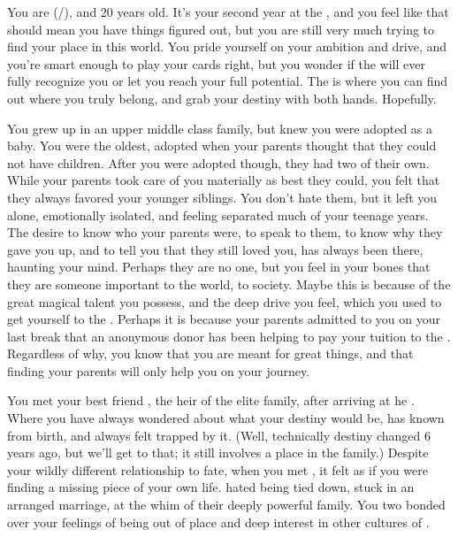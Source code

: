 \documentclass[char]{GL2020}
\begin{document}
\name{\cAmbition{}}

You are \cAmbition{\full} (\cAmbition{\they}/\cAmbition{\them}), and 20 years old. It's your second year at the \pSchool{}, and you feel like that should mean you have things figured out, but you are still very much trying to find your place in this world. You pride yourself on your ambition and drive, and you're smart enough to play your cards right, but you wonder if the \pTechies{} will ever fully recognize you or let you reach your full potential. The \pSchool{} is where you can find out where you truly belong, and grab your destiny with both hands. Hopefully.  

You grew up in an upper middle class family,  but knew you were adopted as a baby.  You were the oldest, adopted when your parents thought that they could not have children.  After you were adopted though, they had two of their own.  While your parents took care of you materially as best they could, you felt that they always favored your younger siblings.  You don’t hate them, but it left you alone, emotionally isolated, and feeling separated much of your teenage years.  The desire to know who your parents were, to speak to them, to know why they gave you up,  and to tell you that they still loved you, has always been there, haunting your mind. Perhaps they are no one, but you feel in your bones that they are someone important to the world, to society. Maybe this is because of the great magical talent you possess, and the deep drive you feel, which you used to get yourself to the \pSchool{}.   Perhaps it is because your parents admitted to you on your last break that an anonymous donor has been helping to pay your tuition to the \pSc{}. Regardless of why, you know that you are meant for great things, and that finding your parents will only help you on your journey.  

You met your best friend \cHeir{\full}, the heir of the elite \cHeir{\formal} family, after arriving at he \pSc{}. Where you have always wondered about what your destiny would be, \cHeir{} has known from birth, and always felt trapped by it. (Well, technically \cHeir{\their} destiny changed 6 years ago, but we’ll get to that; it still involves a place in the \cHeir{\formal} family.) Despite your wildly different relationship to fate, when you met \cHeir{\them}, it felt as if you were finding a missing piece of your own life. \cHeir{\They} hated being tied down, stuck in an arranged marriage, at the whim of their deeply powerful family. You two bonded over your feelings of being out of place and deep interest in other cultures of \pEarth{}. 
\end{document}
